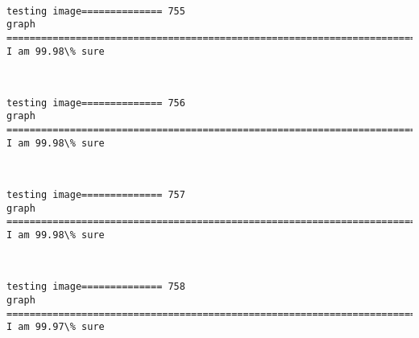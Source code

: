 \documentclass[11pt]{article}
\begin{document}
    \begin{center}
    \end{center}
    { \hspace*{\fill} \\}
    
    \begin{Verbatim}[commandchars=\\\{\}]
testing image============== 755
graph
============================================================================
I am 99.98\% sure

    \end{Verbatim}

    \begin{center}
    \end{center}
    { \hspace*{\fill} \\}
    
    \begin{Verbatim}[commandchars=\\\{\}]
testing image============== 756
graph
============================================================================
I am 99.98\% sure

    \end{Verbatim}

    \begin{center}
    \end{center}
    { \hspace*{\fill} \\}
    
    \begin{Verbatim}[commandchars=\\\{\}]
testing image============== 757
graph
============================================================================
I am 99.98\% sure

    \end{Verbatim}

    \begin{center}
    \end{center}
    { \hspace*{\fill} \\}
    
    \begin{Verbatim}[commandchars=\\\{\}]
testing image============== 758
graph
============================================================================
I am 99.97\% sure

    \end{Verbatim}
\end{document}

